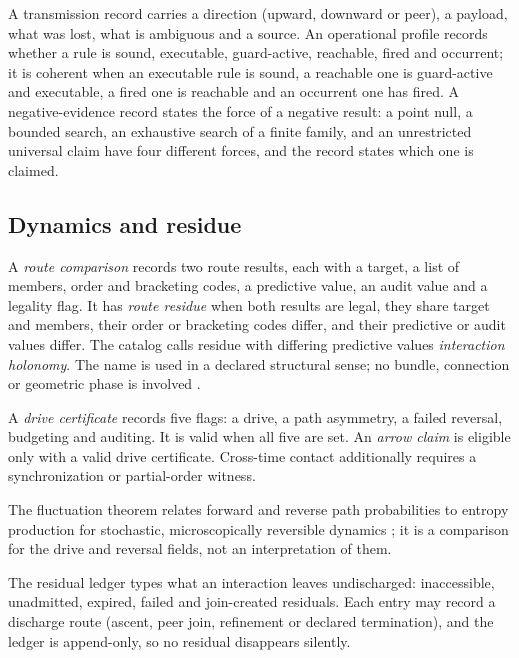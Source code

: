 A transmission record carries a direction (upward, downward or peer), a payload, what was
lost, what is ambiguous and a source. An operational profile records whether a rule is
sound, executable, guard-active, reachable, fired and occurrent; it is coherent when an
executable rule is sound, a reachable one is guard-active and executable, a fired one is
reachable and an occurrent one has fired. A negative-evidence record states the force of a negative result: a point null, a
bounded search, an exhaustive search of a finite family, and an unrestricted universal
claim have four different forces, and the record states which one is claimed.

\subsection{Dynamics and residue}

\begin{definition}
\label{def:route}
A \emph{route comparison} records two route results, each with a target, a list of
members, order and bracketing codes, a predictive value, an audit value and a legality
flag. It has \emph{route residue} when both results are legal, they share target and
members, their order or bracketing codes differ, and their predictive or audit values
differ. The catalog calls residue with differing predictive values \emph{interaction
holonomy}. The name is used in a declared structural sense; no bundle, connection or
geometric phase is involved \citep{Berry1984}.
\end{definition}

\begin{definition}
\label{def:drive}
A \emph{drive certificate} records five flags: a drive, a path asymmetry, a failed
reversal, budgeting and auditing. It is valid when all five are set. An \emph{arrow claim} is eligible only with a valid drive certificate.
Cross-time contact additionally requires a synchronization or partial-order witness.
\end{definition}

The fluctuation theorem relates forward and reverse path probabilities to entropy
production for stochastic, microscopically reversible dynamics \citep{Crooks1999}; it is a
comparison for the drive and reversal fields, not an interpretation of them.

The residual ledger types what an interaction leaves undischarged: inaccessible,
unadmitted, expired, failed and join-created residuals. Each entry may record a discharge
route (ascent, peer join, refinement or declared termination), and the ledger is
append-only, so no residual disappears silently.

